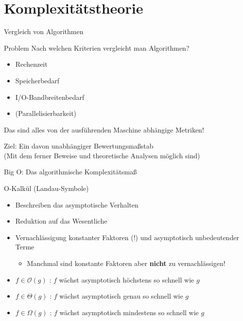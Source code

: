 \section{Komplexitätstheorie}

\begin{frame}{Vergleich von Algorithmen}
	\begin{block}{Problem}
		Nach welchen Kriterien vergleicht man Algorithmen?
	\end{block}

	\pause

	\begin{itemize}
		\item Rechenzeit
		\item Speicherbedarf
		\item I/O-Bandbreitenbedarf
		\item (Parallelisierbarkeit)
	\end{itemize}

	\pause
	
	Das sind alles von der ausführenden Maschine abhängige Metriken!
	
	Ziel: Ein davon unabhängiger Bewertungsmaßstab \\
	\footnotesize{(Mit dem ferner Beweise und theoretische Analysen möglich sind)}
\end{frame}

\begin{frame}{Big O: Das algorithmische Komplexitätsmaß}
	\begin{block}{O-Kalkül (Landau-Symbole)}
		\begin{itemize}
			\item Beschreiben das asymptotische Verhalten 
			\item Reduktion auf das Wesentliche
			\item Vernachlässigung konstanter Faktoren (!) und asymptotisch unbedeutender Terme
			\begin{itemize}
				\item Manchmal sind konstante Faktoren aber \textbf{nicht} zu vernachlässigen!
			\end{itemize}
		\end{itemize}
		
		\pause
		
		\begin{itemize}
			\item $f \in \mathcal{O}(g)$ : $f$ wächst asymptotisch höchstens so schnell wie $g$
			\item $f \in \Theta(g)$ : $f$ wächst asymptotisch genau so schnell wie $g$
			\item $f \in \Omega(g)$ : $f$ wächst asymptotisch mindestens so schnell wie $g$
		\end{itemize}
	\end{block}
\end{frame}

